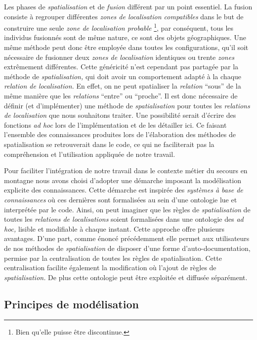 Les phases de \emph{spatialisation} et de \emph{fusion} différent par
un point essentiel. La fusion consiste à regrouper différentes
\emph{zones de localisation compatibles} dans le but de construire une
seule \emph{zone de localisation probable} \footnote{Bien qu'elle
  puisse être discontinue.}, par conséquent, tous les individus
fusionnés sont de même nature, ce sont des objets géographiques. Une
même méthode peut donc être employée dans toutes les configurations,
qu'il soit nécessaire de fusionner deux \emph{zones de localisation}
identiques ou trente \emph{zones} extrêmement différentes. Cette
généricité n'est cependant pas partagée par la méthode de
\emph{spatialisation,} qui doit avoir un comportement adapté à la
chaque \emph{relation de localisation.} En effet, on ne peut
spatialiser la \emph{relation} \enquote{sous} de la même manière que
les \emph{relations} \enquote{entre} ou \enquote{proche}. Il est donc
nécessaire de définir (et d'implémenter) une méthode de
\emph{spatialisation} pour toutes les \emph{relations de localisation}
que nous souhaitons traiter.
%
Une possibilité serait d'écrire des fonctions \emph{ad hoc} lors de
l'implémentation et de les détailler ici. Ce faisant l'ensemble des
connaissances produites lors de l'élaboration des méthodes de
spatialisation se retrouverait dans le code, ce qui ne faciliterait
pas la compréhension et l'utilisation appliquée de notre travail.

Pour faciliter l'intégration de notre travail dans le contexte métier
du secours en montagne nous avons choisi d'adopter une démarche
imposant la modélisation explicite des connaissances. Cette démarche
est inspirée des \emph{systèmes à base de connaissances} où ces
dernières sont formalisées au sein d'une ontologie lue et interprétée
par le code. Ainsi, on peut imaginer que les règles de
\emph{spatialisation} de toutes les \emph{relations de localisations}
soient formalisées dans une ontologie des \emph{ad hoc,} lisible et
modifiable à chaque instant. Cette approche offre plusieurs
avantages. D'une part, comme énoncé précédemment elle permet aux
utilisateurs de nos méthodes de \emph{spatialisation} de disposer
d'une forme d'auto-documentation, permise par la centralisation de
toutes les règles de spatialisation. Cette centralisation facilite
également la modification où l'ajout de règles de
\emph{spatialisation.} De plus cette ontologie peut être exploitée et
diffusée séparément.

\subsection{Principes de modélisation}

